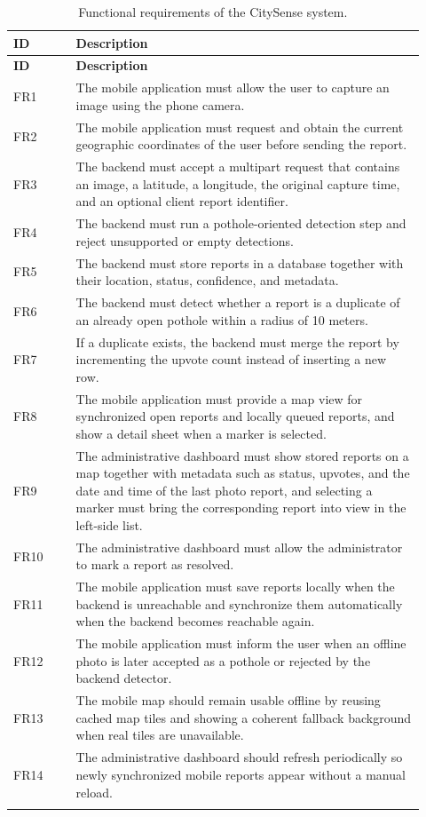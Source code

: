 \begin{longtable}{>{\raggedright\arraybackslash}p{0.14\linewidth} >{\raggedright\arraybackslash}p{0.78\linewidth}}
\toprule
\textbf{ID} & \textbf{Description} \\
\midrule
\endfirsthead
\toprule
\textbf{ID} & \textbf{Description} \\
\midrule
\endhead
FR1 & The mobile application must allow the user to capture an image using the phone camera. \\
FR2 & The mobile application must request and obtain the current geographic coordinates of the user before sending the report. \\
FR3 & The backend must accept a multipart request that contains an image, a latitude, a longitude, the original capture time, and an optional client report identifier. \\
FR4 & The backend must run a pothole-oriented detection step and reject unsupported or empty detections. \\
FR5 & The backend must store reports in a database together with their location, status, confidence, and metadata. \\
FR6 & The backend must detect whether a report is a duplicate of an already open pothole within a radius of 10 meters. \\
FR7 & If a duplicate exists, the backend must merge the report by incrementing the upvote count instead of inserting a new row. \\
FR8 & The mobile application must provide a map view for synchronized open reports and locally queued reports, and show a detail sheet when a marker is selected. \\
FR9 & The administrative dashboard must show stored reports on a map together with metadata such as status, upvotes, and the date and time of the last photo report, and selecting a marker must bring the corresponding report into view in the left-side list. \\
FR10 & The administrative dashboard must allow the administrator to mark a report as resolved. \\
FR11 & The mobile application must save reports locally when the backend is unreachable and synchronize them automatically when the backend becomes reachable again. \\
FR12 & The mobile application must inform the user when an offline photo is later accepted as a pothole or rejected by the backend detector. \\
FR13 & The mobile map should remain usable offline by reusing cached map tiles and showing a coherent fallback background when real tiles are unavailable. \\
FR14 & The administrative dashboard should refresh periodically so newly synchronized mobile reports appear without a manual reload. \\
\bottomrule
\caption{Functional requirements of the CitySense system.}
\label{tab:functional_requirements}
\end{longtable}

